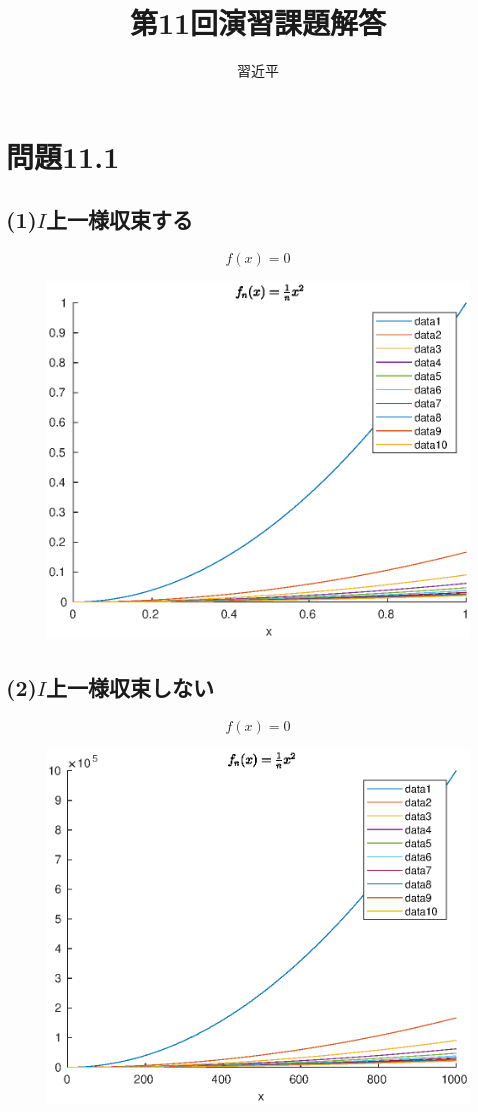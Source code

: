 \documentclass{jreport}
\begin{document}
\title{第11回演習課題解答}
\author{習近平}
\maketitle
\newpage
\tableofcontents
\newpage
\setcounter{chapter}{11}
\section{問題11.1}
\subsection{(1)$I$上一様収束する}
$$
f(x) =0
$$
\begin{figure}[H]
\centering
	\includegraphics[scale=0.3]{1.eps}
\end{figure}
\subsection{(2)$I$上一様収束しない}
$$
f(x) = 0
$$
\begin{figure}[H]
	\centering
	\includegraphics[scale=0.3]{2.eps}
\end{figure}
\end{document}
